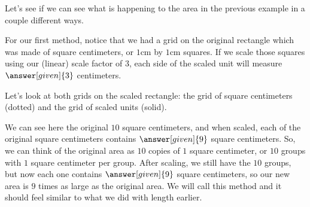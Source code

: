\documentclass{ximera}
\begin{document}
Let's see if we can see what is happening to the area in the previous example in a couple different ways. 

\begin{explanation}
For our first method, notice that we had a grid on the original rectangle which was made of square centimeters, or $1$cm by $1$cm squares. If we scale those squares using our (linear) scale factor of $3$, each side of the scaled unit will measure $\answer[given]{3}$ centimeters.
\begin{image}
\end{image}
Let's look at both grids on the scaled rectangle: the grid of square centimeters (dotted) and the grid of scaled units (solid).
\begin{image}
\end{image}
We can see here the original $10$ square centimeters, and when scaled, each of the original square centimeters contains $\answer[given]{9}$ square centimeters. So, we can think of the original area as $10$ copies of $1$ square centimeter, or $10$ groups with $1$ square centimeter per group. After scaling, we still have the $10$ groups, but now each one contains $\answer[given]{9}$ square centimeters, so our new area is $9$ times as large as the original area. We will call this method  and it should feel similar to what we did with length earlier.


\end{explanation}
\end{document}
